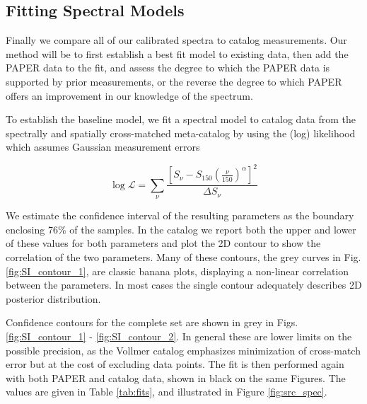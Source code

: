 \documentclass[preprint]{aastex}
\newcommand{\logL}{\log\mathcal{L}}
\begin{document}


\subsection{Fitting Spectral Models}
\label{sec:fitting_models}

Finally we compare all of our  calibrated spectra to catalog measurements. Our method
will be to first establish a best fit model to existing data, then add the PAPER data
to the fit, and assess the degree to which the PAPER data is supported by prior measurements, or the reverse
the degree to which PAPER offers an improvement in our knowledge of the spectrum.

 To establish the baseline model, we
fit a spectral model to catalog data from the spectrally and spatially
cross-matched meta-catalog by \citet{Vollmer:2010p6422} using the
 (log) likelihood which assumes Gaussian measurement errors

\begin{equation}
\logL = \sum_\nu{\frac{\left[S_\nu - S_{150}\left(\frac{\nu}{150}\right)^\alpha\right]^2}{\Delta S_\nu} }
\end{equation}


We estimate the confidence interval of the resulting parameters as the boundary
enclosing 76\% of the samples. In the catalog we report both the upper and
lower of these values for both parameters and plot the 2D contour to show the
correlation of the two parameters. Many of these contours, the grey curves in
Fig. \ref{fig:SI_contour_1}, are classic banana plots, displaying a non-linear
correlation between the parameters.    In most cases the single contour
adequately describes 2D posterior distribution.

Confidence contours for
the complete set are shown in grey in Figs. \ref{fig:SI_contour_1} -
\ref{fig:SI_contour_2}.  In general these are lower limits on the possible
precision, as the Vollmer catalog emphasizes minimization of cross-match error
but at the cost of excluding data points.  The fit is then performed again with
both PAPER and catalog data, shown in black on the same Figures. The values are
given in Table \ref{tab:fits}, and
illustrated in Figure \ref{fig:src_spec}.  
\end{document}
